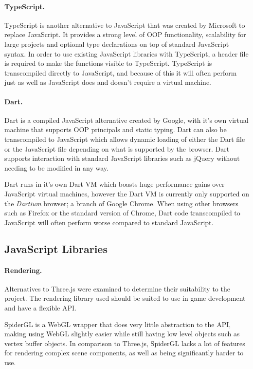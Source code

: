 \paragraph{TypeScript.}
TypeScript is another alternative to JavaScript that was created by Microsoft to replace JavaScript. It provides a strong level of OOP functionality, scalability for large projects and optional type declarations on top of standard JavaScript syntax.\cite{typescript} In order to use existing JavaScript libraries with TypeScript, a header file is required to make the functions visible to TypeScript. TypeScript is transcompiled directly to JavaScript, and because of this it will often perform just as well as JavaScript does and doesn't require a virtual machine.

\paragraph{Dart.}
Dart is a compiled JavaScript alternative created by Google, with it's own virtual machine that supports OOP principals and static typing. Dart can also be transcompiled to JavaScript which allows dynamic loading of either the Dart file or the JavaScript file depending on what is supported by the browser.\cite{dart} Dart supports interaction with standard JavaScript libraries such as jQuery without needing to be modified in any way.

Dart runs in it's own Dart VM which boasts huge performance gains over JavaScript virtual machines, however the Dart VM is currently only supported on the \emph{Dartium} browser; a branch of Google Chrome. When using other browsers such as Firefox or the standard version of Chrome, Dart code transcompiled to JavaScript will often perform worse compared to standard JavaScript.\cite{dartperformance}

\subsection{JavaScript Libraries}

\paragraph{Rendering.}
Alternatives to Three.js were examined to determine their suitability to the project. The rendering library used should be suited to use in game development and have a flexible API.

SpiderGL is a WebGL wrapper that does very little abstraction to the API, making using WebGL slightly easier while still having low level objects such as vertex buffer objects.\cite{spidergl} In comparison to Three.js, SpiderGL lacks a lot of features for rendering complex scene components, as well as being significantly harder to use.

